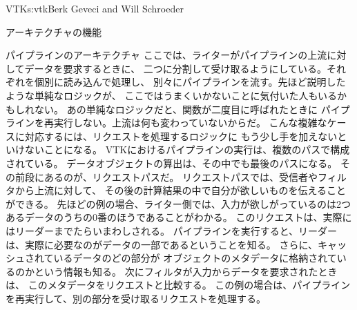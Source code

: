 \begin{aosachapter}{VTK}{s:vtk}{Berk Geveci and Will Schroeder}
\begin{aosasect1}{アーキテクチャの機能}
\begin{aosasect2}{パイプラインのアーキテクチャ}
ここでは、ライターがパイプラインの上流に対してデータを要求するときに、
二つに分割して受け取るようにしている。それぞれを個別に読み込んで処理し、
別々にパイプラインを流す。先ほど説明したような単純なロジックが、
ここではうまくいかないことに気付いた人もいるかもしれない。
あの単純なロジックだと、関数が二度目に呼ばれたときに
パイプラインを再実行しない。上流は何も変わっていないからだ。
こんな複雑なケースに対応するには、リクエストを処理するロジックに
もう少し手を加えないといけないことになる。
VTKにおけるパイプラインの実行は、複数のパスで構成されている。
データオブジェクトの算出は、その中でも最後のパスになる。
その前段にあるのが、リクエストパスだ。
リクエストパスでは、受信者やフィルタから上流に対して、
その後の計算結果の中で自分が欲しいものを伝えることができる。
先ほどの例の場合、ライター側では、入力が欲しがっているのは2つあるデータのうちの0番のほうであることがわかる。
このリクエストは、実際にはリーダーまでたらいまわしされる。
パイプラインを実行すると、リーダーは、実際に必要なのがデータの一部であるということを知る。
さらに、キャッシュされているデータのどの部分が
オブジェクトのメタデータに格納されているのかという情報も知る。
次にフィルタが入力からデータを要求されたときは、
このメタデータをリクエストと比較する。
この例の場合は、パイプラインを再実行して、別の部分を受け取るリクエストを処理する。


\end{aosasect2}
\end{aosasect1}
\end{aosachapter}
